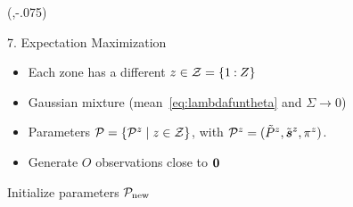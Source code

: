 \documentclass[presentation]{beamer}
\begin{document}
\begin{frame}
  \begin{textblock}{5.1}(\thirdcol,-.075)
    \begin{block}{7. Expectation Maximization}
      \begin{center}
        \begin{minipage}[c]{0.95\linewidth}
          \begin{itemize}
            \item Each zone has a different ${z\in\mathcal{Z}=\{1\mathbin{:} Z\}}$
            \item Gaussian mixture (mean~\eqref{eq:lambdafuntheta} and ${\Sigma\to0}$)
            \item Parameters ${\mathcal{P}=\{\mathcal{P}^{z}\mid z\in\mathcal{Z}\}}$, with ${\mathcal{P}^{z}=(\tilde{P}^{z},\tilde{\boldsymbol{s}}^{z},\pi^{z})}$.
            \item Generate $O$ observations close to $\mathbf{0}$
          \end{itemize}
          \vspace{1.cm}
          \begin{algorithm2e}[h]
            \DontPrintSemicolon%
            Initialize parameters $\mathcal{P}_{\mathrm{new}}$\;
            \caption{Expectation Maximization}\label{alg:em}
          \end{algorithm2e}
        \end{minipage}
      \end{center}
    \end{block}
  \end{textblock}



\end{frame}
\end{document}
